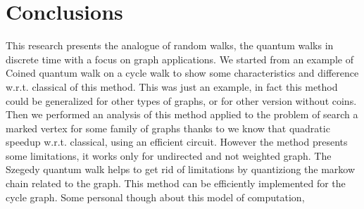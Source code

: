 \section{Conclusions}

This research presents the analogue of random walks, the quantum walks in discrete time with a focus on graph applications. We started from 
an example of Coined quantum walk on a cycle walk to show some characteristics and difference w.r.t. classical of this method. This was just
an example, in fact this method could be generalized for other types of graphs, or for other version without coins. Then we performed
an analysis of this method applied to the problem of search a marked vertex for some family of graphs thanks to \cite{douglas2014complexity}
we know that quadratic speedup w.r.t. classical, using an efficient circuit. However the method presents some limitations, it works only for undirected and not weighted graph. The Szegedy
quantum walk helps to get rid of limitations by quantiziong the markow chain related to the graph. This method
can be efficiently implemented for the cycle graph. Some personal though about this model of computation,    